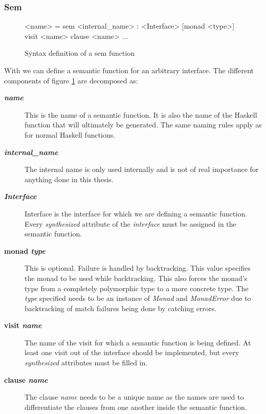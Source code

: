 \subsubsection{Sem}
\begin{figure}[!h]
\begin{code}
<name> = sem <internal_name> : <Interface> [monad <type>]
          {visit <name>
             {clause <name>
                ...
             }
          }
\end{code}
\caption{Syntax definition of a sem function}
\label{sem:syntax}
\end{figure}

With  we can define a semantic function for an arbitrary interface. The different components of figure \ref{sem:syntax} are decomposed as:

\begin{description}
\item[\textbf{\textit{name}}] This is the name of a semantic function. It is also the name of the Haskell function that will ultimately be generated. The same naming rules apply as for normal Haskell functions.
\item[\textbf{\textit{internal\_name}}] The internal name is only used internally and is not of real importance for anything done in this thesis.
\item[\textbf{\textit{Interface}}] Interface is the interface for which we are defining a semantic function. Every \emph{synthesized} attribute of the \emph{interface} must be assigned in the semantic function.
\item[\textbf{monad \textit{type}}] { This is optional. Failure is handled by backtracking. This value specifies the monad to be used while backtracking. This also forces the monad's type from a completely polymorphic type to a more concrete type. The \textit{type} specified needs to be an instance of \emph{Monad} and \emph{MonadError} due to backtracking of match failures being done by catching errors.}
\item[\textbf{visit \textit{name}}] The name of the visit for which a semantic function is being defined. At least one visit out of the interface should be implemented, but every \emph{synthesized} attributes must be filled in.
\item[\textbf{clause \textit{name}}] The clause \textit{name} needs to be a unique name as the names are used to differentiate the clauses from one another inside the semantic function.
\end{description}

